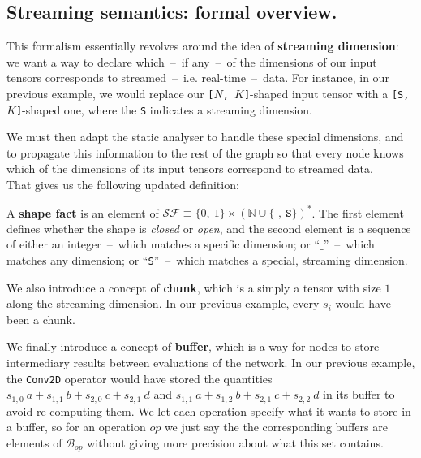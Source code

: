 \documentclass[11pt]{article}
\begin{document}
\subsection{Streaming semantics: formal overview.}

This formalism essentially revolves around the idea of \textbf{streaming dimension}: we want a way to declare which~--~if any~--~of the dimensions of our input tensors corresponds to streamed~--~i.e. real-time~--~data. For instance, in our previous example, we would replace our \texttt{[$N$, $K$]}-shaped input tensor with a \texttt{[S, $K$]}-shaped one, where the \texttt{S} indicates a streaming dimension.

We must then adapt the static analyser to handle these special dimensions, and to propagate this information to the rest of the graph so that every node knows which of the dimensions of its input tensors correspond to streamed data.\\

\noindent
That gives us the following updated definition:

\begin{definition}
A \textbf{shape fact} is an element of $\mathcal{SF} \equiv \{0,\ 1\} \times \left(\mathbb{N} \cup \{\_,\ \texttt{S}\}\right)^*$. The first element defines whether the shape is \textit{closed} or \textit{open}, and the second element is a sequence of either an integer~--~which matches a specific dimension; or ``$\_$''~--~which matches any dimension; or ``\texttt{S}''~--~which matches a special, streaming dimension.
\end{definition}

We also introduce a concept of \textbf{chunk}, which is a simply a tensor with size $1$ along the streaming dimension. In our previous example, every $s_i$ would have been a chunk.

We finally introduce a concept of \textbf{buffer}, which is a way for nodes to store intermediary results between evaluations of the network. In our previous example, the \texttt{Conv2D} operator would have stored the quantities $s_{1,0} \ a + s_{1,1} \ b + s_{2,0} \ c + s_{2,1} \ d$ and $s_{1,1} \ a + s_{1,2} \ b + s_{2,1} \ c + s_{2,2} \ d$ in its buffer to avoid re-computing them. We let each operation specify what it wants to store in a buffer, so for an operation $op$ we just say the the corresponding buffers are elements of $\mathcal{B}_{op}$ without giving more precision about what this set contains.\\
\end{document}
